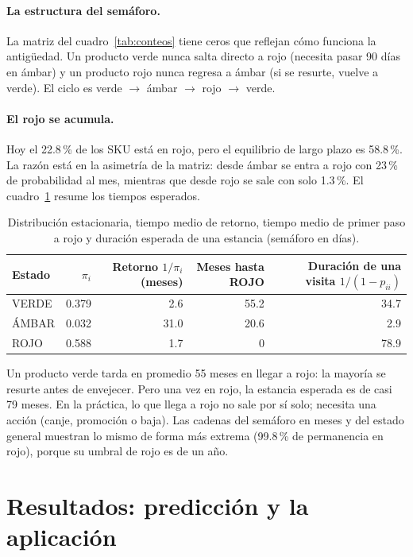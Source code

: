 \documentclass[11pt,letterpaper]{article}
\begin{document}
\paragraph{La estructura del semáforo.} La matriz del cuadro~\ref{tab:conteos} tiene ceros que reflejan cómo funciona la antigüedad. Un producto verde nunca salta directo a rojo (necesita pasar 90 días en ámbar) y un producto rojo nunca regresa a ámbar (si se resurte, vuelve a verde). El ciclo es verde $\to$ ámbar $\to$ rojo $\to$ verde.

\paragraph{El rojo se acumula.} Hoy el 22.8\,\% de los SKU está en rojo, pero el equilibrio de largo plazo es 58.8\,\%. La razón está en la asimetría de la matriz: desde ámbar se entra a rojo con 23\,\% de probabilidad al mes, mientras que desde rojo se sale con solo 1.3\,\%. El cuadro~\ref{tab:tiempos} resume los tiempos esperados.

\begin{table}[H]
\centering\small
\begin{tabular}{@{}l r r r r@{}}
\toprule
Estado & $\pi_i$ & Retorno $1/\pi_i$ (meses) & Meses hasta ROJO & Duración de una visita $1/(1-p_{ii})$ \\
\midrule
VERDE & 0.379 & 2.6 & 55.2 & 34.7 \\
ÁMBAR & 0.032 & 31.0 & 20.6 & 2.9 \\
ROJO & 0.588 & 1.7 & 0 & 78.9 \\
\bottomrule
\end{tabular}
\caption{Distribución estacionaria, tiempo medio de retorno, tiempo medio de primer paso a rojo y duración esperada de una estancia (semáforo en días).}
\label{tab:tiempos}
\end{table}

Un producto verde tarda en promedio 55 meses en llegar a rojo: la mayoría se resurte antes de envejecer. Pero una vez en rojo, la estancia esperada es de casi 79 meses. En la práctica, lo que llega a rojo no sale por sí solo; necesita una acción (canje, promoción o baja). Las cadenas del semáforo en meses y del estado general muestran lo mismo de forma más extrema (99.8\,\% de permanencia en rojo), porque su umbral de rojo es de un año.

\section{Resultados: predicción y la aplicación}
\end{document}
